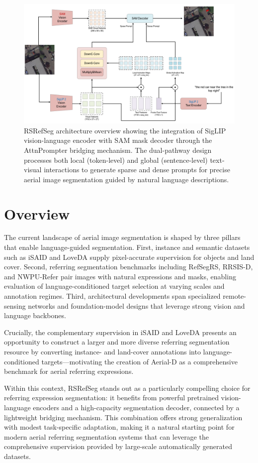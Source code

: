 \begin{figure}[H]
\centering
\includegraphics[width=\textwidth]{Images/clipsam.png}
\caption{RSRefSeg architecture overview showing the integration of SigLIP vision-language encoder with SAM mask decoder through the AttnPrompter bridging mechanism. The dual-pathway design processes both local (token-level) and global (sentence-level) text-visual interactions to generate sparse and dense prompts for precise aerial image segmentation guided by natural language descriptions.}
\label{fig:rsrefseg_architecture}
\end{figure}

\section{Overview}

The current landscape of aerial image segmentation is shaped by three pillars that enable language-guided segmentation. First, instance and semantic datasets such as iSAID and LoveDA supply pixel-accurate supervision for objects and land cover. Second, referring segmentation benchmarks including RefSegRS, RRSIS-D, and NWPU-Refer pair images with natural expressions and masks, enabling evaluation of language-conditioned target selection at varying scales and annotation regimes. Third, architectural developments span specialized remote-sensing networks and foundation-model designs that leverage strong vision and language backbones.

Crucially, the complementary supervision in iSAID and LoveDA presents an opportunity to construct a larger and more diverse referring segmentation resource by converting instance- and land-cover annotations into language-conditioned targets—motivating the creation of Aerial-D as a comprehensive benchmark for aerial referring expressions.

Within this context, RSRefSeg stands out as a particularly compelling choice for referring expression segmentation: it benefits from powerful pretrained vision-language encoders and a high-capacity segmentation decoder, connected by a lightweight bridging mechanism. This combination offers strong generalization with modest task-specific adaptation, making it a natural starting point for modern aerial referring segmentation systems that can leverage the comprehensive supervision provided by large-scale automatically generated datasets.